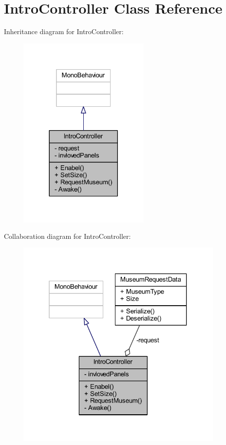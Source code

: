 \hypertarget{class_intro_controller}{}\section{Intro\+Controller Class Reference}
\label{class_intro_controller}


Inheritance diagram for Intro\+Controller\+:
\nopagebreak
\begin{figure}[H]
\begin{center}
\leavevmode
\includegraphics[width=185pt]{class_intro_controller__inherit__graph}
\end{center}
\end{figure}


Collaboration diagram for Intro\+Controller\+:
\nopagebreak
\begin{figure}[H]
\begin{center}
\leavevmode
\includegraphics[width=292pt]{class_intro_controller__coll__graph}
\end{center}
\end{figure}
